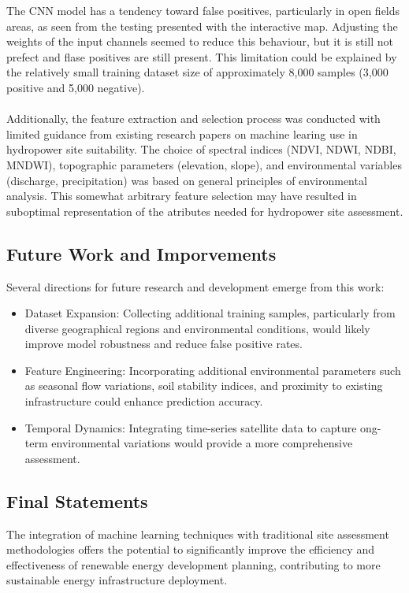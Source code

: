 \documentclass[12pt,a4paper]{article}
\begin{document}
The CNN model has a tendency toward false positives, particularly in open fields
areas, as seen from the testing presented with the interactive map. Adjusting
the weights of the input channels seemed to reduce this behaviour, but it is
still not prefect and flase positives are still present. This limitation could
be explained by the relatively small training dataset size of approximately
8,000 samples (3,000 positive and 5,000 negative).
\\
\\
Additionally, the feature extraction and selection process was conducted with
limited guidance from existing research papers on machine learing use in
hydropower site suitability. The choice of spectral indices (NDVI, NDWI, NDBI,
MNDWI), topographic parameters (elevation, slope), and environmental variables
(discharge, precipitation) was based on general principles of environmental
analysis. This somewhat arbitrary feature selection may have resulted in
suboptimal representation of the atributes needed for hydropower site assessment.

\subsection{Future Work and Imporvements}

Several directions for future research and development emerge from this work:

\begin{itemize}
  \item Dataset Expansion: Collecting additional training samples, particularly
  from diverse geographical regions and environmental conditions, would likely
  improve model robustness and reduce false positive rates.
  \item Feature Engineering: Incorporating additional environmental parameters
  such as seasonal flow variations, soil stability indices, and proximity to
  existing infrastructure could enhance prediction accuracy.
  \item Temporal Dynamics: Integrating time-series satellite data to capture
  ong-term environmental variations would provide a more comprehensive assessment.
\end{itemize}

\subsection{Final Statements}
The integration of machine learning techniques with traditional site assessment
methodologies offers the potential to significantly improve the efficiency and
effectiveness of renewable energy development planning, contributing to more
sustainable energy infrastructure deployment.

\end{document}

